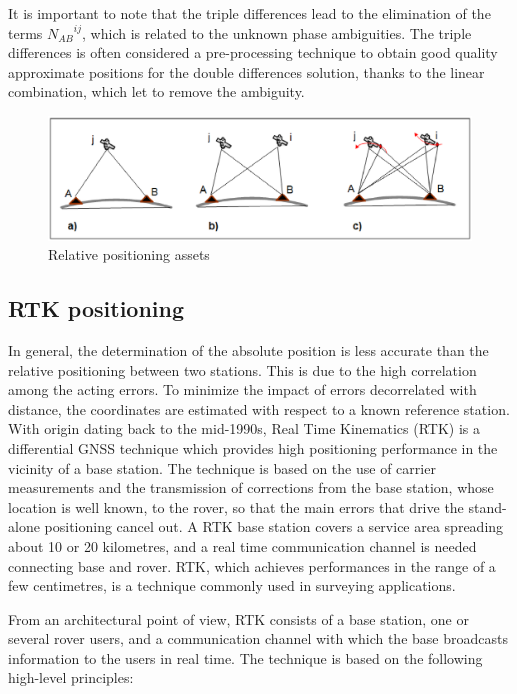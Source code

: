 It is important to note that the triple differences lead to the elimination of the terms ${N_{AB}}^{ij}$, which is related to the unknown phase ambiguities. The triple differences is often considered a pre-processing technique to obtain good quality approximate positions for the double differences solution, thanks to the linear combination, which let to remove the ambiguity.

\begin{figure}[ht] 
	\centering
	\includegraphics[scale=0.8]{fig/relative_positioning.eps} 
	\caption{Relative positioning assets}
	\label{FIG:relative_positioning} 
\end{figure}

\subsection{RTK positioning}

In general, the determination of the absolute position is less accurate than the relative positioning
between two stations. This is due to the high correlation among the acting errors. To minimize the impact of errors decorrelated with distance, the coordinates
are estimated with respect to a known reference station.
With origin dating back to the mid-1990s, Real Time Kinematics (RTK) is a differential GNSS technique which provides high positioning performance in the vicinity of a base station. The technique is based on the use of carrier measurements and the transmission of corrections from the base station, whose location is well known, to the rover, so that the main errors that drive the stand-alone positioning cancel out. A RTK base station covers a service area spreading about 10 or 20 kilometres, and a real time communication channel is needed connecting base and rover. RTK, which achieves performances in the range of a few centimetres, is a technique commonly used in surveying applications.

From an architectural point of view, RTK consists of a base station, one or several rover users, and a communication channel with which the base broadcasts information to the users in real time.
The technique is based on the following high-level principles:

